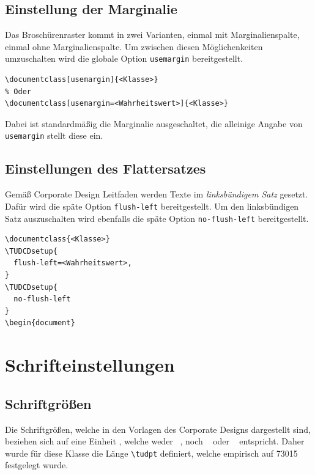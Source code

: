 \documentclass[
  logo={
    color=blue,
    language=de,
    colormodel=rgb
  },
  fontsize=11tudpt,
  usemargin,
  oneside
]{tudcdreprt}
\begin{document}
\subsection{Einstellung der Marginalie}

Das Broschürenraster kommt in zwei Varianten, einmal mit Marginalienspalte,
einmal ohne Marginalienspalte.
Um zwischen diesen Möglichenkeiten umzuschalten
wird die globale Option \texttt{usemargin} bereitgestellt.
\begin{lstlisting}
\documentclass[usemargin]{<Klasse>}
% Oder
\documentclass[usemargin=<Wahrheitswert>]{<Klasse>}
\end{lstlisting}
Dabei ist standardmäßig die Marginalie ausgeschaltet, die alleinige Angabe von \texttt{usemargin}
stellt diese ein.

\subsection{Einstellungen des Flattersatzes}

Gemäß Corporate Design Leitfaden werden Texte im \emph{linksbündigem Satz}
gesetzt. Dafür wird die späte Option \texttt{flush-left} bereitgestellt.
Um den linksbündigen Satz auszuschalten wird ebenfalls die späte Option \texttt{no-flush-left}
bereitgestellt.
\begin{lstlisting}
\documentclass{<Klasse>}
\TUDCDsetup{
  flush-left=<Wahrheitswert>,
}
\TUDCDsetup{
  no-flush-left
}
\begin{document}
\end{lstlisting}

\section{Schrifteinstellungen}

\subsection{Schriftgrößen}

Die Schriftgrößen, welche in den Vorlagen des Corporate Designs dargestellt sind, beziehen sich auf eine
Einheit \unit{\texpt}, welche weder \unit{\texpt\tex}, noch \unit{\texpt\word} oder \unit{\texpt\adobe} entspricht.
Daher wurde für diese Klasse die Länge \lstinline|\tudpt| definiert, welche empirisch auf \qty{73015}{\texsp} festgelegt wurde.
\end{document}
